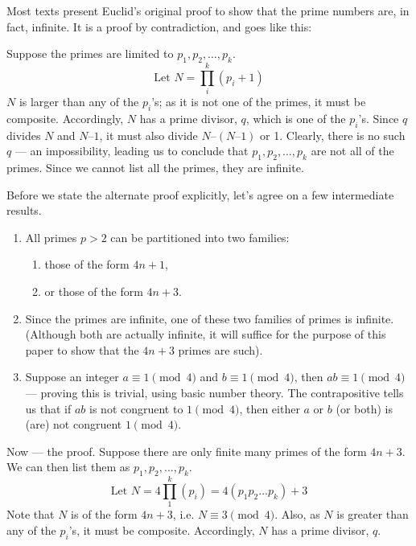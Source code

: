 
Most texts present Euclid’s original proof to show that the prime numbers are, in fact, infinite. It is a proof by contradiction, and goes like this:

Suppose the primes are limited to \(p_1, p_2, \ldots, p_k\).
\[\text{Let } N = \prod_i^k(p_i+1)\]
\(N\) is larger than any of the \(p_i\)’s; as it is not one of the primes, it must be composite. Accordingly, \(N\) has a prime divisor, \(q\), which is one of the \(p_i\)’s. Since \(q\) divides \(N\) and \(N – 1\), it must also divide \(N – (N – 1)\) or 1. Clearly, there is no such \(q\) --– an impossibility, leading us to conclude that \(p_1, p_2, \ldots, p_k\) are not all of the primes. Since we cannot list all the primes, they are infinite.

Before we state the alternate proof explicitly, let’s agree on a few intermediate results.
\begin{enumerate}
    \item All primes \(p > 2\) can be partitioned into two families:
    \begin{enumerate}
        \item those of the form \(4n + 1\),
        \item or those of the form \(4n + 3\).
    \end{enumerate}
    \item Since the primes are infinite, one of these two families of primes is infinite. (Although both are actually infinite, it will suffice for the purpose of this paper to show that the \(4n + 3\) primes are such).
    \item Suppose an integer \(a \equiv 1 \pmod{4} \) and \(b \equiv 1 \pmod{4} \), then \(ab \equiv 1 \pmod{4} \) --– proving this is trivial, using basic number theory. The contrapositive tells us that if \(ab\) is not congruent to \(1 \pmod{4}\), then either \(a\) or \(b\) (or both) is (are) not congruent \(1 \pmod{4}\).
\end{enumerate} 

Now --- the proof. Suppose there are only finite many primes of the form \(4n + 3\). We can then list them as \(p_1, p_2, \ldots, p_k\).
\[\text{Let } N = 4\prod_1^k(p_i)= 4(p_1p_2\ldots{}p_k) + 3\] Note that \(N\) is of the form \(4n + 3\), i.e. \(N \equiv 3 \pmod{4}\). Also, as \(N\) is greater than any of the \(p_i\)’s, it must be composite. Accordingly, \(N\) has a prime divisor, \(q\).

